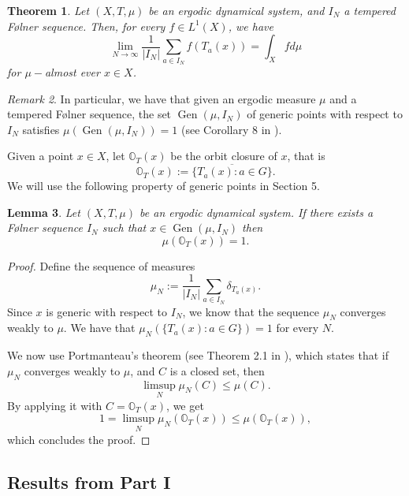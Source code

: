 \documentclass[a4paper,11pt,reqno]{amsart}
\theoremstyle{plain}
\newtheorem{theorem}{Theorem}[section]
\newtheorem{lemma}[theorem]{Lemma}
\theoremstyle{remark}
\newtheorem{remark}[theorem]{Remark}
\DeclareMathOperator{\Gen}{Gen}
\begin{document}
	\begin{theorem}
		\label{thm: ergodic theorem}
		Let $(X,T,\mu)$ be an ergodic dynamical system, and $I_N$ a tempered Følner sequence. Then, for every $f\in L^1(X)$, we have $$\lim_{N \rightarrow \infty} \frac{1}{|I_N|} \sum_{a\in I_N} f(T_a(x)) = \int_X f d \mu$$ for $\mu-$almost ever $x \in X$.
		
	\end{theorem}  
	
	\begin{remark}
		\label{rmk: ergodic measures are mutualy singular}
		In particular, we have that given an ergodic measure $\mu$ and a tempered Følner sequence, the set $\Gen(\mu,I_N)$ of generic points with respect to $I_N$ satisfies $\mu(\Gen(\mu,I_N)) = 1$ (see Corollary 8 in \cite{Host}). 
	\end{remark}
	
	Given a point $x \in X$, let $\mathbb{O}_T(x)$ be the orbit closure of $x$, that is $$\mathbb{O}_T(x) := \overline{\{T_a(x):a \in G\}}.$$
	We will use the following property of generic points in Section 5.


	\begin{lemma}
		\label{lm: x generic implies full meausure orbit closure}
		Let $(X,T,\mu)$ be an ergodic dynamical system. If there exists a  Følner sequence $I_N$ such that $x\in \Gen(\mu,I_N)$ then $$\mu\left(\mathbb{O}_T(x)\right) = 1.$$
	\end{lemma}
	
	\begin{proof}	Define the sequence of measures $$\mu_N := \frac{1}{|I_N|}\sum_{a\in I_N} \delta_{T_a(x)}. $$ Since $x$ is generic with respect to $I_N$, we know that the sequence $\mu_N$ converges weakly to $\mu$. We have that $\mu_N(\{T_a(x):a \in G\}) = 1$ for every $N$.
		
		We now use Portmanteau's theorem  (see Theorem 2.1 in \cite{Billingsley}), which states that if $\mu_N $ converges weakly to $\mu$, and $C$ is a closed set, then $$\limsup_N \mu_N(C) \leq \mu(C). $$  By applying it with $C =\mathbb{O}_T(x)$, we get $$1 =\limsup_N \mu_N(\mathbb{O}_T(x)) \leq \mu(\mathbb{O}_T(x)), $$ which concludes the proof.
	\end{proof}

\subsection{Results from Part I}
\end{document}
